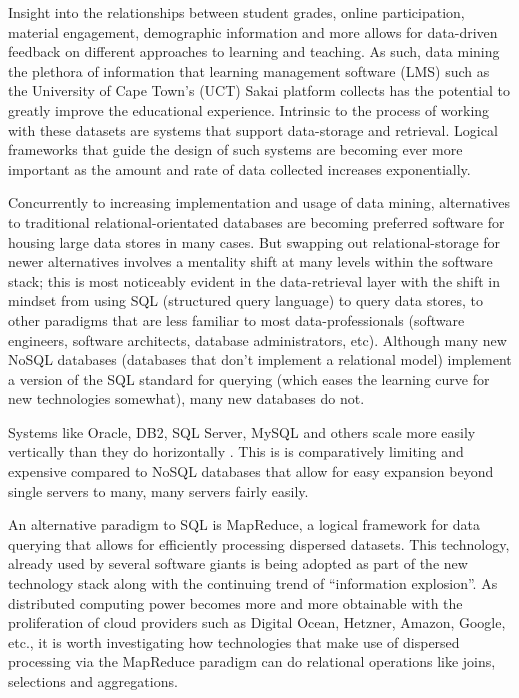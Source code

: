 Insight into the relationships between student grades, online participation, material engagement, demographic information and more allows for data-driven feedback on different approaches to learning and teaching. As such, data mining the plethora of information that learning management software (LMS) such as the University of Cape Town's (UCT) Sakai platform \cite{sakai} collects has the potential to greatly improve the educational experience. Intrinsic to the process of working with these datasets are systems that support data-storage and retrieval. Logical frameworks that guide the design of such systems are becoming ever more important as the amount and rate of data collected increases exponentially.

Concurrently to increasing implementation and usage of data mining, alternatives to traditional relational-orientated databases are becoming preferred software for housing large data stores in many cases. But swapping out relational-storage for newer alternatives involves a mentality shift at many levels within the software stack; this is most noticeably evident in the data-retrieval layer with the shift in mindset from using SQL (structured query language) to query data stores, to other paradigms that are less familiar to most data-professionals (software engineers, software architects, database administrators, etc). Although many new NoSQL databases (databases that don't implement a relational model) implement a version of the SQL standard for querying (which eases the learning curve for new technologies somewhat), many new databases do not.

Systems like Oracle, DB2, SQL Server, MySQL and others scale more easily vertically than they do horizontally \cite{couchbaseWhitePaper}. This is is comparatively limiting and expensive compared to NoSQL databases that allow for easy expansion beyond single servers to many, many servers fairly easily.

An alternative paradigm to SQL is MapReduce, a logical framework for data querying that allows for efficiently processing dispersed datasets. This technology, already used by several software giants \cite{chandar2010} is being adopted as part of the new technology stack along with the continuing trend of ``information explosion''. As distributed computing power becomes more and more obtainable with the proliferation of cloud providers such as Digital Ocean, Hetzner, Amazon, Google, etc., it is worth investigating how technologies that make use of dispersed processing via the MapReduce paradigm can do relational operations like joins, selections and aggregations.

